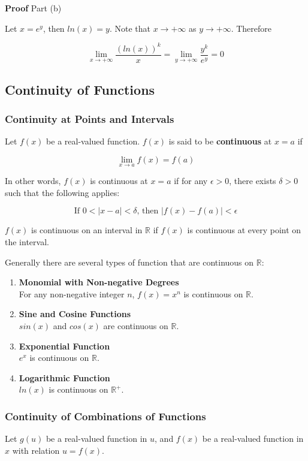 \documentclass[a4paper,12pt]{article}
\newcommand{\s}{\vspace{1mm}}
\newcommand{\n}{\vspace{3mm}}
\newcommand{\R}{\mathbb{R}}
\newenvironment{block}[4][Block]{ %
\begin{list}{}{
  \setlength{\leftmargin}{0mm}
  \setlength{\rightmargin}{0mm}
  \setlength{\topsep}{0mm}
  \setlength{\partopsep}{0mm}
  \parsep\parskip
  \setlength{\itemsep}{-\parsep}
  }
  \needspace{\baselineskip}
  \item \textbf{#2 #3} \hspace{1mm} #4
  \vspace{1mm}
  \item
  }
{
\end{list}
}
\newenvironment{alist}{ %
\begin{enumerate}[label=(\alph*)]
}{
\end{enumerate}
}
\begin{document}
\begin{block}{Proof}{}{Part (b)}
  Let $x=e^{y}$, then $ln(x)=y$. Note that $x\to +\infty$ as $y\to +\infty$. Therefore

  $$\lim_{x\to +\infty}\frac{(ln(x))^{k}}{x}=\lim_{y\to +\infty}\frac{y^{k}}{e^{y}}=0$$

\end{block}\n

\subsection{Continuity of Functions}
\subsubsection{Continuity at Points and Intervals}
Let $f(x)$ be a real-valued function. $f(x)$ is said to be \textbf{continuous} at $x=a$ if

$$\lim_{x\to a}f(x)=f(a)$$\s

In other words, $f(x)$ is continuous at $x=a$ if for any $\epsilon>0$, there exists $\delta>0$ such that the following applies:

$$\text{If }0<\left| x-a\right| <\delta\text{, then }\left| f(x)-f(a)\right| <\epsilon$$\s

$f(x)$ is continuous on an interval in $\R$ if $f(x)$ is continuous at every point on the interval.\n

Generally there are several types of function that are continuous on $\R$:
\begin{alist}
  \item \textbf{Monomial with Non-negative Degrees}\\
  For any non-negative integer $n$, $f(x)=x^{n}$ is continuous on $\R$.
  \item \textbf{Sine and Cosine Functions}\\
  $sin(x)$ and $cos(x)$ are continuous on $\R$.
  \item \textbf{Exponential Function}\\
  $e^{x}$ is continuous on $\R$.
  \item \textbf{Logarithmic Function}\\
  $ln(x)$ is continuous on $\R^{+}$.
\end{alist}

\subsubsection{Continuity of Combinations of Functions}
Let $g(u)$ be a real-valued function in $u$, and $f(x)$ be a real-valued function in $x$ with relation $u=f(x)$.\n
\end{document}
